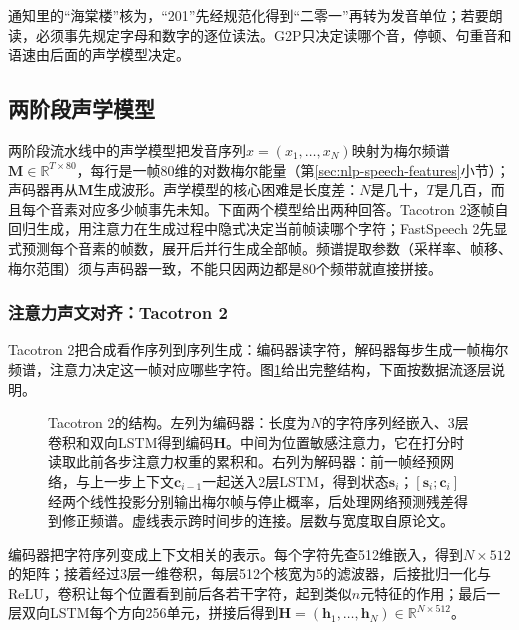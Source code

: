 通知里的“海棠楼”核为，“201”先经规范化得到“二零一”再转为发音单位；若要朗读，必须事先规定字母和数字的逐位读法。G2P只决定读哪个音，停顿、句重音和语速由后面的声学模型决定。

\subsection{两阶段声学模型}
\label{sec:nlp-speech-acoustics}

两阶段流水线中的声学模型把发音序列$x=(x_1,\ldots,x_N)$映射为梅尔频谱$\bm{M}\in\mathbb{R}^{T\times80}$，每行是一帧80维的对数梅尔能量（第\ref{sec:nlp-speech-features}小节）；声码器再从$\bm{M}$生成波形。声学模型的核心困难是长度差：$N$是几十，$T$是几百，而且每个音素对应多少帧事先未知。下面两个模型给出两种回答。Tacotron 2逐帧自回归生成，用注意力在生成过程中隐式决定当前帧读哪个字符；FastSpeech 2先显式预测每个音素的帧数，展开后并行生成全部帧。频谱提取参数（采样率、帧移、梅尔范围）须与声码器一致，不能只因两边都是80个频带就直接拼接。

\subsubsection{注意力声文对齐：Tacotron 2}
\label{sec:nlp-speech-tacotron}

Tacotron 2把合成看作序列到序列生成：编码器读字符，解码器每步生成一帧梅尔频谱，注意力决定这一帧对应哪些字符。图\ref{fig:nlp-speech-tacotron2}给出完整结构，下面按数据流逐层说明。

\begin{figure}[tp]
  \centering
  
  \caption{Tacotron 2的结构。左列为编码器：长度为$N$的字符序列经嵌入、3层卷积和双向LSTM得到编码$\bm H$。中间为位置敏感注意力，它在打分时读取此前各步注意力权重的累积和。右列为解码器：前一帧经预网络，与上一步上下文$\bm c_{i-1}$一起送入2层LSTM，得到状态$\bm s_i$；$[\bm s_i;\bm c_i]$经两个线性投影分别输出梅尔帧与停止概率，后处理网络预测残差得到修正频谱。虚线表示跨时间步的连接。层数与宽度取自原论文。}
  \label{fig:nlp-speech-tacotron2}
\end{figure}

编码器把字符序列变成上下文相关的表示。每个字符先查512维嵌入，得到$N\times512$的矩阵；接着经过3层一维卷积，每层512个核宽为5的滤波器，后接批归一化与ReLU，卷积让每个位置看到前后各若干字符，起到类似$n$元特征的作用；最后一层双向LSTM每个方向256单元，拼接后得到$\bm{H}=(\bm{h}_1,\ldots,\bm{h}_N)\in\mathbb{R}^{N\times512}$。

